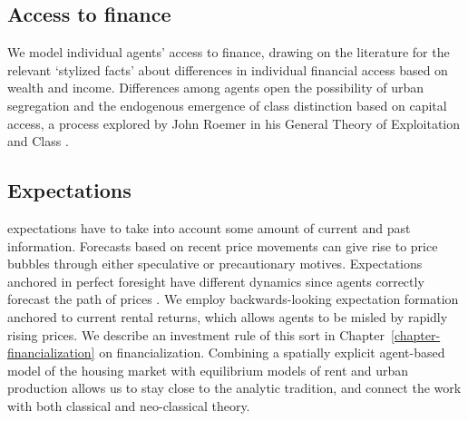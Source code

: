 \subsection{Access to finance}
We model individual agents' access to finance, %
drawing on the literature for the relevant `\gls{stylized facts}' about differences in individual financial access based on wealth and income. Differences among agents open the possibility of urban segregation and the endogenous emergence of \gls{class} distinction based on capital access, a process explored by John Roemer in his General Theory of Exploitation and Class \cite{roemerGeneralTheoryExploitation1982}.  

\subsection{Expectations}
\Glspl{expectation} have to take into account some amount of current and past information. Forecasts based on recent price movements can give rise to \glspl{price bubble} through either speculative or precautionary motives. Expectations anchored in \gls{perfect foresight} have different dynamics since agents correctly forecast the path of prices \cite{muthRationalExpectationsTheory1961}. We employ backwards-looking expectation formation anchored 
to current rental returns, which allows agents to be misled by rapidly rising prices. We describe an investment rule of this sort in Chapter~\ref{chapter-financialization} on financialization. 
Combining a spatially explicit agent-based model of the housing market with equilibrium models of rent and urban production allows us to stay close to the analytic tradition, and connect the work with both classical and neo-classical theory. 





